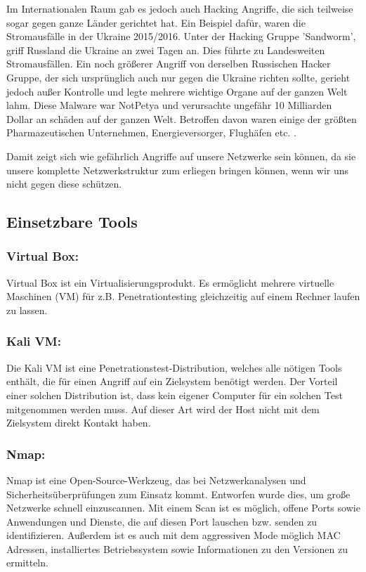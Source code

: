 Im Internationalen Raum gab es jedoch auch Hacking Angriffe, die sich teilweise sogar gegen ganze Länder gerichtet hat. Ein Beispiel dafür, waren die Stromausfälle in der Ukraine 2015/2016. Unter der Hacking Gruppe 'Sandworm', griff Russland die Ukraine an zwei Tagen an. Dies führte zu Landesweiten Stromausfällen. Ein noch größerer Angriff von derselben Russischen Hacker Gruppe, der sich ursprünglich auch nur gegen die Ukraine richten sollte, gerieht jedoch außer Kontrolle und legte mehrere wichtige Organe auf der ganzen Welt lahm. Diese Malware war NotPetya und verursachte ungefähr 10 Milliarden Dollar an schäden auf der ganzen Welt. Betroffen davon waren einige der größten Pharmazeutischen Unternehmen, Energieversorger, Flughäfen etc. \cite{ref_url4}. \par
Damit zeigt sich wie gefährlich Angriffe auf unsere Netzwerke sein können, da sie unsere komplette Netzwerkstruktur zum erliegen bringen können, wenn wir uns nicht gegen diese schützen.

\subsection{Einsetzbare Tools}
\subsubsection{Virtual Box:}
Virtual Box ist ein Virtualisierungsprodukt. Es ermöglicht mehrere virtuelle Maschinen (VM) für z.B. Penetrationtesting gleichzeitig auf einem Rechner laufen zu lassen.\cite{ref_url5}\par

\subsubsection{Kali VM:}
Die Kali VM ist eine Penetrationstest-Distribution, welches alle nötigen Tools enthält, die für einen Angriff auf ein Zielsystem benötigt werden. Der Vorteil einer solchen Distribution ist, dass kein eigener Computer für ein solchen Test mitgenommen werden muss. Auf dieser Art wird der Host nicht mit dem Zielsystem direkt Kontakt haben.\cite{ref_url6}\par

\subsubsection{Nmap:}
Nmap ist eine Open-Source-Werkzeug, das bei Netzwerkanalysen und Sicherheitsüberprüfungen zum Einsatz kommt. Entworfen wurde dies, um große Netzwerke schnell einzuscannen. Mit einem Scan ist es möglich, offene Ports sowie Anwendungen und Dienste, die auf diesen Port lauschen bzw. senden zu identifizieren. Außerdem ist es auch mit dem aggressiven Mode möglich MAC Adressen, installiertes Betriebssystem sowie Informationen zu den Versionen zu ermitteln.\cite{ref_url7}\par

